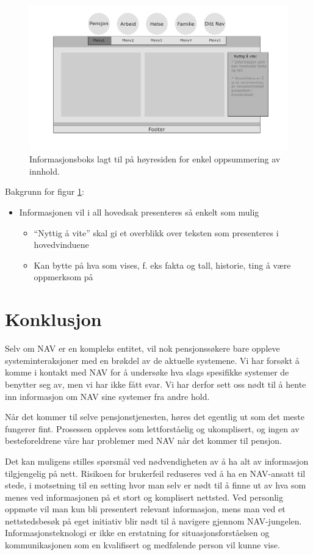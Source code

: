 \documentclass[informationsecurity]{gucmasterproject}
\begin{document}
\begin{figure}[h!]
	\centering
	\includegraphics[width=40em]{Skisse_2}
	\caption{Informasjonsboks lagt til på høyresiden for enkel oppsummering av innhold.}
	\label{fig:skisse2}
\end{figure}

Bakgrunn for figur \ref{fig:skisse2}:
\begin{itemize}
\item Informasjonen vil i all hovedsak presenteres så enkelt som mulig
\begin{itemize}
\item “Nyttig å vite” skal gi et overblikk over teksten som presenteres i hovedvinduene
\item Kan bytte på hva som vises, f. eks fakta og tall, historie, ting å være oppmerksom på
\end{itemize}
\end{itemize}

\chapter{Konklusjon}
Selv om NAV er en kompleks entitet, vil nok pensjonssøkere bare oppleve systeminteraksjoner med en brøkdel av de aktuelle systemene. Vi har forsøkt å komme i kontakt med NAV for å undersøke hva slags spesifikke systemer de benytter seg av, men vi har ikke fått svar. Vi har derfor sett oss nødt til å hente inn informasjon om NAV sine systemer fra andre hold.

Når det kommer til selve pensjonstjenesten, høres det egentlig ut som det meste fungerer fint. Prosessen oppleves som lettforståelig og ukomplisert, og ingen av besteforeldrene våre har problemer med NAV når det kommer til pensjon.

Det kan muligens stilles spørsmål ved nødvendigheten av å ha alt av informasjon tilgjengelig på nett. Risikoen for brukerfeil reduseres ved å ha en NAV-ansatt til stede, i motsetning til en setting hvor man selv er nødt til å finne ut av hva som menes ved informasjonen på et stort og komplisert nettsted. Ved personlig oppmøte vil man kun bli presentert relevant informasjon, mens man ved et nettstedsbesøk på eget initiativ blir nødt til å navigere gjennom NAV-jungelen. Informasjonsteknologi er ikke en erstatning for situasjonsforståelsen og kommunikasjonen som en kvalifisert og medfølende person vil kunne vise.
\end{document}
